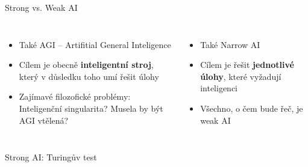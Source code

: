 \documentclass[aspectratio=169,dvipsnames]{beamer}
\begin{document}
\begin{frame}{Strong vs. Weak AI}

    \begin{columns}[t]

        \vspace{5pt}

        \begin{itemize}

            \item<2-> Také AGI -- Artifitial General Inteligence

            \item<3-> Cílem je obecně \textbf{inteligentní stroj}, který v důsledku
                toho umí řešit úlohy

            \item<4-> Zajímavé filozofické problémy: Inteligenční singularita?
                Musela by být AGI vtělená?

        \end{itemize}



        \vspace{5pt}

        \begin{itemize}

            \item<6-> Také Narrow AI

            \item<7-> Cílem je řešit \textbf{jednotlivé úlohy}, které vyžadují
                inteligenci

            \item<8-> Všechno, o čem bude řeč, je weak AI

        \end{itemize}
    \end{columns}


\end{frame}


\begin{frame}{Strong AI: Turingův test}

\end{frame}

\end{document}
